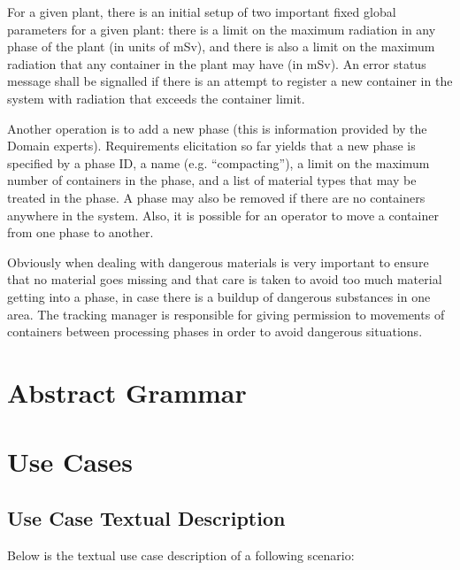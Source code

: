 \documentclass[fontsize=12pt,paper=letter,twoside]{scrartcl}
\begin{document}
For a given plant, there is an initial setup of two important fixed global parameters for a given plant: there is a limit on the maximum radiation in any phase of the plant (in units of mSv), and there is also a limit on the maximum radiation that any container in the plant may have (in mSv). An error status message shall be signalled if there is an attempt to register a new container in the system with radiation that exceeds the container limit.

Another operation is to add a new phase (this is information provided by the Domain experts). Requirements elicitation so far yields that a new phase is specified by a phase ID, a name (e.g. “compacting”), a limit on the maximum number of containers in the phase, and a list of material types that may be treated in the phase. A phase may also be removed if there are no containers anywhere in the system. Also, it is possible for an operator to move a container from one phase to another.

Obviously when dealing with dangerous materials is very important to ensure that no material goes missing and that care is taken to avoid too much material getting into a phase, in case there is a buildup of dangerous substances in one area. The tracking manager is responsible for giving permission to movements of containers between processing phases in order to avoid dangerous situations.

\newpage
\section{Abstract Grammar}




\newpage
\section{Use Cases}

\subsection{Use Case Textual Description}

Below is the textual use case description of a following scenario:
\end{document}
